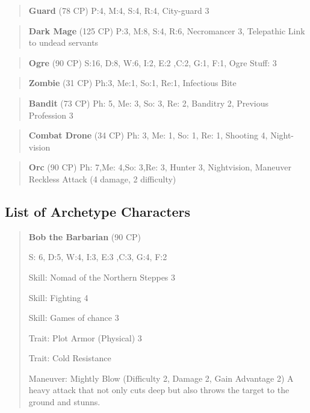 \documentclass[11pt]{article}
\begin{document}
{\begin{multicols}{2}[]
\begin{quote}
\textbf{Guard} (78 CP)
P:4, M:4, S:4, R:4, City-guard 3
\end{quote}

\begin{quote}
\textbf{Dark Mage} (125 CP)
P:3, M:8, S:4, R:6, Necromancer 3, Telepathic Link to undead servants
\end{quote}

\begin{quote}
\textbf{Ogre} (90 CP)
S:16, D:8, W:6, I:2, E:2 ,C:2, G:1, F:1, Ogre Stuff: 3
\end{quote}

\begin{quote}
\textbf{Zombie} (31 CP)
Ph:3, Me:1, So:1, Re:1, Infectious Bite
\end{quote}

\begin{quote}
\textbf{Bandit} (73 CP)
Ph: 5, Me: 3, So: 3, Re: 2, Banditry 2, Previous Profession 3
\end{quote}

\begin{quote}
\textbf{Combat Drone} (34 CP)
Ph: 3, Me: 1, So: 1, Re: 1, Shooting 4, Night-vision
\end{quote}

\begin{quote}
\textbf{Orc} (90 CP)
Ph: 7,Me: 4,So: 3,Re: 3, Hunter 3, Nightvision, Maneuver Reckless Attack (4 damage, 2 difficulty)
\end{quote}

\subsection{List of Archetype Characters}
\label{sec:org6604e60}
\begin{quote}
\textbf{Bob the Barbarian} (90 CP)

S: 6, D:5, W:4, I:3, E:3 ,C:3, G:4, F:2

Skill: Nomad of the Northern Steppes 3

Skill: Fighting 4

Skill: Games of chance 3

Trait: Plot Armor (Physical) 3

Trait: Cold Resistance

Maneuver: Mightly Blow (Difficulty 2, Damage 2, Gain Advantage 2)
A heavy attack that not only cuts deep but also throws the target to the ground and stunns.
\end{quote}


\end{multicols}}
\end{document}
